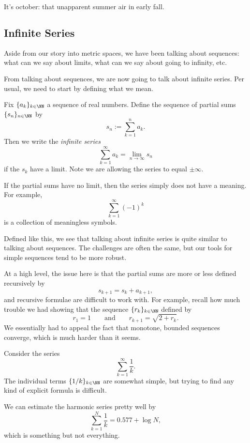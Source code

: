 













It's october: that unapparent summer air in early fall.

\subsection{Infinite Series}
Aside from our story into metric spaces, we have been talking about sequences: what can we say about limits, what can we say about going to infinity, etc.

From talking about sequences, we are now going to talk about infinite series. Per usual, we need to start by defining what we mean.
\begin{defi}
	Fix $\{a_k\}_{k\in\NN}$ a sequence of real numbers. Define the sequence of partial sums $\{s_n\}_{n\in\NN}$ by
	\[s_n:=\sum_{k=1}^na_k.\]
	Then we write the \textit{infinite series}
	\[\sum_{k=1}^\infty a_k=\lim_{n\to\infty}s_n\]
	if the $s_k$ have a limit. Note we are allowing the series to equal $\pm\infty.$
\end{defi}
\begin{warn}
	If the partial sums have no limit, then the series simply does not have a meaning. For example,
	\[\sum_{k=1}^\infty(-1)^k\]
	is a collection of meaningless symbols.
\end{warn}
Defined like this, we see that talking about infinite series is quite similar to talking about sequences. The challenges are often the same, but our tools for simple sequences tend to be more robust.

At a high level, the issue here is that the partial sums are more or less defined recursively by
\[s_{k+1}=s_k+a_{k+1},\]
and recursive formulae are difficult to work with. For example, recall how much trouble we had showing that the sequence $\{r_k\}_{k\in\NN}$ defined by
\[r_1=1\qquad\text{and}\qquad r_{k+1}=\sqrt{2+r_k}.\]
We essentially had to appeal the fact that monotone, bounded sequences converge, which is much harder than it seems.
\begin{example}
	Consider the series
	\[\sum_{k=1}^\infty\frac1k.\]
	The individual terms $\{1/k\}_{k\in\NN}$ are somewhat simple, but trying to find any kind of explicit formula is difficult.
\end{example}
\begin{remark}[Nir]
	We can estimate the harmonic series pretty well by
	\[\sum_{k=1}^N\frac1k=0.577+\log N,\]
	which is something but not everything.
\end{remark}

